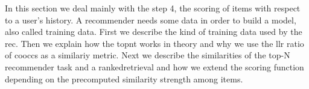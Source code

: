 In this section we deal mainly with the step 4, the scoring of items with respect to a user's history.
A recommender needs some data in order to build a model, also called training data. 
First we describe the kind of training data used by the \gls{rec}. 
Then we explain how the \gls{topnt} works in theory and why we use the \gls{llr} ratio of \glspl{coocc} as a similariy metric.
Next we describe the similarities of the top-N recommender task and a \gls{rankedretrieval} and how we extend the scoring function depending on the precomputed similarity strength among items. 






